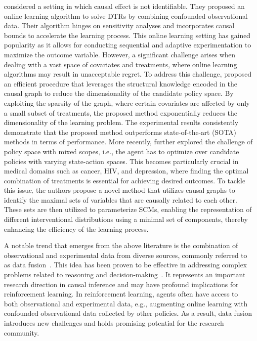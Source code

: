 \documentclass[10pt]{article} %
\theoremstyle{definition}
\begin{document}
\citet{zhangNearOptimalReinforcementLearning2019a} considered a setting in which causal effect is not identifiable. They proposed an online learning algorithm to solve DTRs by combining confounded observational data. Their algorithm hinges on sensitivity analyses and incorporates causal bounds to accelerate the learning process. 
This online learning setting has gained popularity as it allows for conducting sequential and adaptive experimentation to maximize the outcome variable. However, a significant challenge arises when dealing with a vast space of covariates and treatments, where online learning algorithms may result in unacceptable regret.
To address this challenge, \citet{zhangDesigningOptimalDynamic2020a} proposed an efficient procedure that leverages the structural knowledge encoded in the causal graph to reduce the dimensionality of the candidate policy space. By exploiting the sparsity of the graph, where certain covariates are affected by only a small subset of treatments, the proposed method exponentially reduces the dimensionality of the learning problem. The experimental results consistently demonstrate that the proposed method outperforms state-of-the-art (SOTA) methods in terms of performance.
More recently, \citet{zhangOnlineReinforcementLearning2022} further explored the challenge of policy space with mixed scopes, i.e., the agent has to optimize over candidate policies with varying state-action spaces. This becomes particularly crucial in medical domains such as cancer, HIV, and depression, where finding the optimal combination of treatments is essential for achieving desired outcomes. To tackle this issue, the authors propose a novel method that utilizes causal graphs to identify the maximal sets of variables that are causally related to each other. These sets are then utilized to parameterize SCMs, enabling the representation of different interventional distributions using a minimal set of components, thereby enhancing the efficiency of the learning process.

A notable trend that emerges from the above literature is the combination of observational and experimental data from diverse sources, commonly referred to as data fusion~\citep{bareinboimPearlHierarchyFoundations2022}. This idea has been proven to be effective in addressing complex problems related to reasoning and decision-making~\citep{zhangNearOptimalReinforcementLearning2019a,leeGeneralIdentifiabilityArbitrary2020a,correaNestedCounterfactualIdentification2021,zhangPartialCounterfactualIdentification2022,gasseUsingConfoundedData2023}. It represents an important research direction in causal inference and may have profound implications for reinforcement learning. In reinforcement learning, agents often have access to both observational and experimental data, e.g., augmenting online learning with confounded observational data collected by other policies. As a result, data fusion introduces new challenges and holds promising potential for the research community.
\end{document}
